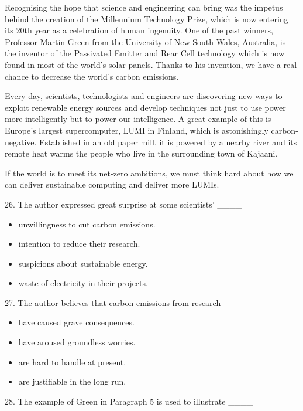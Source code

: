 \documentclass[UTF8,11pt]{ctexart}
\begin{document}
Recognising the hope that science and engineering can bring was the impetus behind the creation of the Millennium Technology Prize, which is now entering its 20th year as a celebration of human ingenuity. One of the past winners, Professor Martin Green from the University of New South Wales, Australia, is the inventor of the Passivated Emitter and Rear Cell technology which is now found in most of the world’s solar panels. Thanks to his invention, we have a real chance to decrease the world’s carbon emissions.


Every day, scientists, technologists and engineers are discovering new ways to exploit renewable energy sources and develop techniques not just to use power more intelligently but to power our intelligence. A great example of this is Europe’s largest supercomputer, LUMI in Finland, which is astonishingly carbon-negative. Established in an old paper mill, it is powered by a nearby river and its remote heat warms the people who live in the surrounding town of Kajaani.


If the world is to meet its net-zero ambitions, we must think hard about how we can deliver sustainable computing and deliver more LUMIs.


26. The author expressed great surprise at some scientists’ \_\_\_\_


\begin{itemize}[leftmargin=2em,itemsep=.2em,topsep=.4em]\item[A.] unwillingness to cut carbon emissions.
\item[B.] intention to reduce their research.
\item[C.] suspicions about sustainable energy.
\item[D.] waste of electricity in their projects.
\end{itemize}

27. The author believes that carbon emissions from research \_\_\_\_


\begin{itemize}[leftmargin=2em,itemsep=.2em,topsep=.4em]\item[A.] have caused grave consequences.
\item[B.] have aroused groundless worries.
\item[C.] are hard to handle at present.
\item[D.] are justifiable in the long run.
\end{itemize}

28. The example of Green in Paragraph 5 is used to illustrate \_\_\_\_
\end{document}
